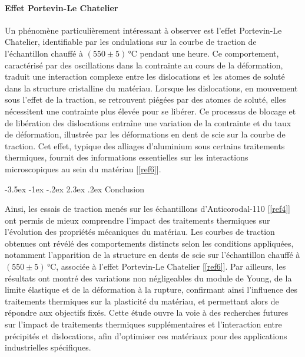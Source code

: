 \documentclass[a4paper, 12pt,oneside]{article}
\makeatletter
\renewcommand{\section}{\@startsection {section}{1}{\z@}%
             {-3.5ex \@plus -1ex \@minus -.2ex}%
             {2.3ex \@plus.2ex}%
             {\normalfont\normalsize\bfseries}}
\makeatother
\begin{document}
\vspace{-0.2cm}
\paragraph{Effet Portevin-Le Chatelier}

Un phénomène particulièrement intéressant à observer est l’effet Portevin-Le Chatelier, identifiable par les ondulations sur la courbe de traction de l’échantillon chauffé à $(550 \pm 5)$\,°C pendant une heure. Ce comportement, caractérisé par des oscillations dans la contrainte au cours de la déformation, traduit une interaction complexe entre les dislocations et les atomes de soluté dans la structure cristalline du matériau. Lorsque les dislocations, en mouvement sous l’effet de la traction, se retrouvent piégées par des atomes de soluté, elles nécessitent une contrainte plus élevée pour se libérer. Ce processus de blocage et de libération des dislocations entraîne une variation de la contrainte et du taux de déformation, illustrée par les déformations en dent de scie sur la courbe de traction. Cet effet, typique des alliages d’aluminium sous certains traitements thermiques, fournit des informations essentielles sur les interactions microscopiques au sein du matériau [\ref{ref6}].

\vspace{-1cm}
\section{Conclusion}
\vspace{-0.2cm}

Ainsi, les essais de traction menés sur les échantillons d'Anticorodal-110 [\ref{ref4}] ont permis de mieux comprendre l’impact des traitements thermiques sur l'évolution des propriétés mécaniques du matériau. Les courbes de traction obtenues ont révélé des comportements distincts selon les conditions appliquées, notamment l’apparition de la structure en dents de scie sur l’échantillon chauffé à $(550 \pm 5)$\,°C, associée à l’effet Portevin-Le Chatelier [\ref{ref6}]. Par ailleurs, les résultats ont montré des variations non négligeables du module de Young, de la limite élastique et de la déformation à la rupture, confirmant ainsi l’influence des traitements thermiques sur la plasticité du matériau, et permettant alors de répondre aux objectifs fixés. Cette étude ouvre la voie à des recherches futures sur l'impact de traitements thermiques supplémentaires et l'interaction entre précipités et dislocations, afin d'optimiser ces matériaux pour des applications industrielles spécifiques.
\end{document}
